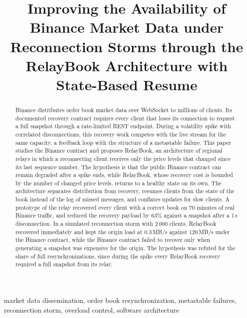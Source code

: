 \documentclass[conference]{IEEEtran}
\begin{document}
\title{Improving the Availability of Binance Market Data under Reconnection Storms through the RelayBook Architecture with State-Based Resume}

\author{
\and
{}
}

\maketitle

\begin{abstract}
Binance distributes order book market data over WebSocket to millions of clients. Its documented recovery contract requires every client that loses its connection to request a full snapshot through a rate-limited REST endpoint. During a volatility spike with correlated disconnections, this recovery work competes with the live stream for the same capacity, a feedback loop with the structure of a metastable failure. This paper studies the Binance contract and proposes RelayBook, an architecture of regional relays in which a reconnecting client receives only the price levels that changed since its last sequence number. The hypothesis is that the public Binance contract can remain degraded after a spike ends, while RelayBook, whose recovery cost is bounded by the number of changed price levels, returns to a healthy state on its own. The architecture separates distribution from recovery, resumes clients from the state of the book instead of the log of missed messages, and conflates updates for slow clients. A prototype of the relay recovered every client with a correct book on 70 minutes of real Binance traffic, and reduced the recovery payload by 63\% against a snapshot after a 1\,s disconnection. In a simulated reconnection storm with 2\,000 clients, RelayBook recovered immediately and kept the origin load at 0.3\,MB/s against 120\,MB/s under the Binance contract, while the Binance contract failed to recover only when generating a snapshot was expensive for the origin. The hypothesis was refuted for the share of full resynchronizations, since during the spike every RelayBook recovery required a full snapshot from its relay.
\end{abstract}

\begin{IEEEkeywords}
market data dissemination, order book resynchronization, metastable failures, reconnection storm, overload control, software architecture
\end{IEEEkeywords}
\end{document}
